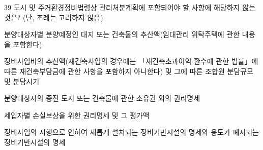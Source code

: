 \begin{question}{39}
도시 및 주거환경정비법령상 관리처분계획에 포함되어야 할 사항에 해당하지 \uline{않는} 것은? (단, 조례는 고려하지 않음)
\begin{choices}
  \item 분양대상자별 분양예정인 대지 또는 건축물의 추산액(임대관리 위탁주택에 관한 내용을 포함한다)
  \item 정비사업비의 추산액(재건축사업의 경우에는 「재건축초과이익 환수에 관한 법률」에 따른 재건축부담금에 관한 사항을 포함하지 아니한다) 및 그에 따른 조합원 분담규모 및 분담시기
  \item 분양대상자의 종전 토지 또는 건축물에 관한 소유권 외의 권리명세
  \item 세입자별 손실보상을 위한 권리명세 및 그 평가액
  \item 정비사업의 시행으로 인하여 새롭게 설치되는 정비기반시설의 명세와 용도가 폐지되는 정비기반시설의 명세
\end{choices}
\end{question}
